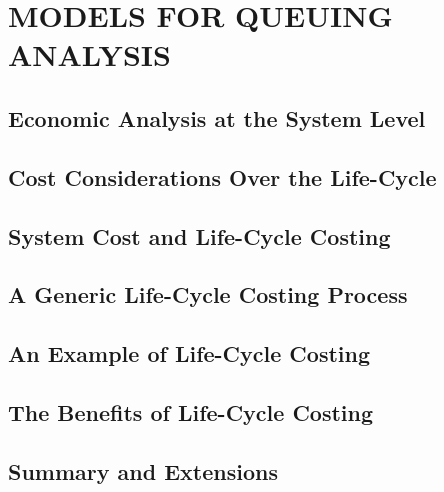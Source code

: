 \chapter{MODELS FOR QUEUING ANALYSIS}\label{chap:14}

\section{Economic Analysis at the System Level}


\section{Cost Considerations Over the Life-Cycle}


\section{System Cost and Life-Cycle Costing}


\section{A Generic Life-Cycle Costing Process}


\section{An Example of Life-Cycle Costing}


\section{The Benefits of Life-Cycle Costing}


\section{Summary and Extensions}


\begin{exercises}
    \begin{exercise}
    \label{sea-14-1}
    
    \end{exercise}
    \begin{solution}
    \end{solution}

\end{exercises}